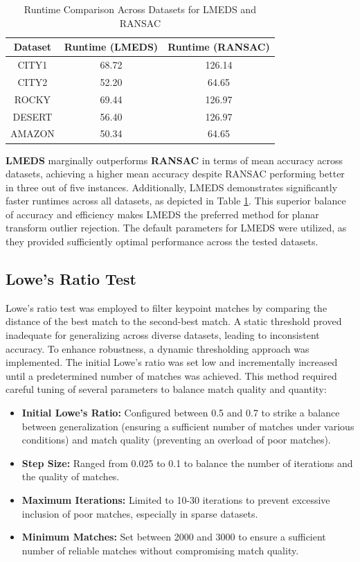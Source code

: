 \begin{itemize}
\begin{table}[H]
    \centering
    \caption{Runtime Comparison Across Datasets for LMEDS and RANSAC}
    \label{tab:runtime_comparison_opt}
    \begin{tabular}{|c|c|c|}
    \hline
    \textbf{Dataset} & \textbf{Runtime (LMEDS)} & \textbf{Runtime (RANSAC)} \\ \hline
    CITY1   & 68.72 & 126.14 \\ \hline
    CITY2   & 52.20 & 64.65  \\ \hline
    ROCKY   & 69.44 & 126.97 \\ \hline
    DESERT  & 56.40 & 126.97 \\ \hline
    AMAZON  & 50.34 & 64.65  \\ \hline
    \end{tabular}
\end{table}

\textbf{LMEDS} marginally outperforms \textbf{RANSAC} in terms of mean accuracy across datasets, achieving a higher mean accuracy despite RANSAC performing better in three out of five instances. Additionally, LMEDS demonstrates significantly faster runtimes across all datasets, as depicted in Table \ref{tab:runtime_comparison_opt}. This superior balance of accuracy and efficiency makes LMEDS the preferred method for planar transform outlier rejection. The default parameters for LMEDS were utilized, as they provided sufficiently optimal performance across the tested datasets.

\subsection{Lowe's Ratio Test}

Lowe's ratio test was employed to filter keypoint matches by comparing the distance of the best match to the second-best match. A static threshold proved inadequate for generalizing across diverse datasets, leading to inconsistent accuracy. To enhance robustness, a dynamic thresholding approach was implemented. The initial Lowe's ratio was set low and incrementally increased until a predetermined number of matches was achieved. This method required careful tuning of several parameters to balance match quality and quantity:

\begin{itemize}
    \item \textbf{Initial Lowe's Ratio:} Configured between 0.5 and 0.7 to strike a balance between generalization (ensuring a sufficient number of matches under various conditions) and match quality (preventing an overload of poor matches).
    \item \textbf{Step Size:} Ranged from 0.025 to 0.1 to balance the number of iterations and the quality of matches.
    \item \textbf{Maximum Iterations:} Limited to 10-30 iterations to prevent excessive inclusion of poor matches, especially in sparse datasets.
    \item \textbf{Minimum Matches:} Set between 2000 and 3000 to ensure a sufficient number of reliable matches without compromising match quality.
\end{itemize}


\end{itemize}

